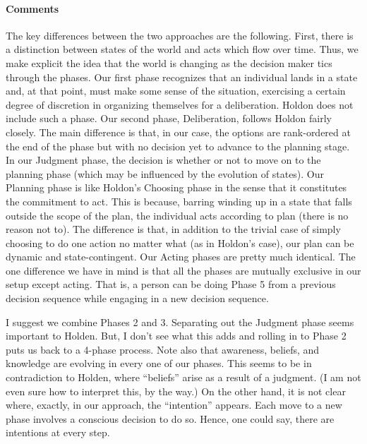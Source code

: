 \documentclass[
11pt,
titlepage,
reqno,
]{article}%
\theoremstyle{definition}
\begin{document}
\paragraph{Comments} The key differences between the two approaches are the following. 
First, there is a distinction between states of the world and acts which flow over time. 
Thus, we make explicit the idea that the world is changing as the decision maker tics through the phases. 
Our first phase recognizes that an individual lands in a state and, at that point, must make some sense of the situation, exercising a certain degree of discretion in  organizing themselves for a deliberation. Holdon does not include such a phase. 
Our second phase, Deliberation, follows Holdon fairly closely. 
The main difference is that, in our case, the options are rank-ordered at the end of the phase but with no decision yet to advance to the planning stage. 
In our Judgment phase, the decision is whether or not to move on to the planning phase (which may be influenced by the evolution of states). 
Our Planning phase is like Holdon's Choosing phase in the sense that it constitutes the commitment to act. 
This is because, barring winding up in a state that falls outside the scope of the plan, the individual acts according to plan (there is no reason not to). 
The difference is that, in addition to the trivial case of simply choosing to do one action no matter what (as in Holdon's case), our plan can be dynamic and state-contingent. 
Our Acting phases are pretty much identical. The one difference we have in mind is that all the phases are mutually exclusive in our setup except acting. 
That is, a person can be doing Phase 5 from a previous decision sequence while engaging in a new decision sequence.  

I suggest we combine Phases 2 and 3. Separating out the Judgment phase seems important to Holden. 
But, I don't see what this adds and rolling in to Phase 2 puts us back to a 4-phase process. 
Note also that awareness, beliefs, and knowledge are evolving in every one of our phases. 
This seems to be in contradiction to Holden, where ``beliefs'' arise as a result of a judgment. 
(I am not even sure how to interpret this, by the way.) 
On the other hand, it is not clear where, exactly, in our approach, the ``intention'' appears. 
Each move to a new phase involves a conscious decision to do so. 
Hence, one could say, there are intentions at every step.
\end{document}
